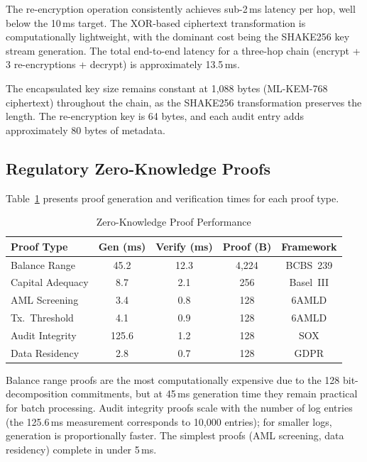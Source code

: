 \documentclass[conference,10pt]{IEEEtran}
\begin{document}
The re-encryption operation consistently achieves sub-2\,ms latency per hop, well below the 10\,ms target. The XOR-based ciphertext transformation is computationally lightweight, with the dominant cost being the SHAKE256 key stream generation. The total end-to-end latency for a three-hop chain (encrypt + 3 re-encryptions + decrypt) is approximately 13.5\,ms.

The encapsulated key size remains constant at 1,088 bytes (ML-KEM-768 ciphertext) throughout the chain, as the SHAKE256 transformation preserves the length. The re-encryption key is 64 bytes, and each audit entry adds approximately 80 bytes of metadata.

\subsection{Regulatory Zero-Knowledge Proofs}

Table~\ref{tab:zkp_perf} presents proof generation and verification times for each proof type.

\begin{table}[htbp]
\centering
\caption{Zero-Knowledge Proof Performance}
\label{tab:zkp_perf}
\begin{tabular}{@{}lcccc@{}}
\toprule
\textbf{Proof Type} & \textbf{Gen (ms)} & \textbf{Verify (ms)} & \textbf{Proof (B)} & \textbf{Framework} \\
\midrule
Balance Range      & 45.2  & 12.3  & 4,224 & BCBS~239 \\
Capital Adequacy   & 8.7   & 2.1   & 256   & Basel~III \\
AML Screening      & 3.4   & 0.8   & 128   & 6AMLD \\
Tx.\ Threshold     & 4.1   & 0.9   & 128   & 6AMLD \\
Audit Integrity    & 125.6 & 1.2   & 128   & SOX \\
Data Residency     & 2.8   & 0.7   & 128   & GDPR \\
\bottomrule
\end{tabular}
\end{table}

Balance range proofs are the most computationally expensive due to the 128 bit-decomposition commitments, but at 45\,ms generation time they remain practical for batch processing. Audit integrity proofs scale with the number of log entries (the 125.6\,ms measurement corresponds to 10,000 entries); for smaller logs, generation is proportionally faster. The simplest proofs (AML screening, data residency) complete in under 5\,ms.
\end{document}
